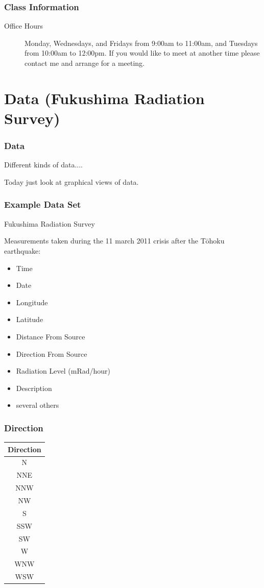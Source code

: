 \begin{frame}
  \frametitle{Class Information}

\begin{description}
  \item[Office Hours] Monday, Wednesdays, and Fridays from 9:00am to
    11:00am, and Tuesdays from 10:00am to 12:00pm.  If you would like
    to meet at another time please contact me and arrange for a
    meeting.

\end{description}


\end{frame}

\section{Data (Fukushima Radiation Survey)}

\begin{frame}
  \frametitle{Data}

  Different kinds of data....

  Today just look at graphical views of data.

\end{frame}

\begin{frame}
  \frametitle{Example Data Set}

  Fukushima Radiation Survey

  Measurements taken during the 11 march 2011 crisis after the
  T\={o}hoku earthquake:
  \begin{itemize}
  \item Time
  \item Date
  \item Longitude
  \item Latitude
  \item Distance From Source
  \item Direction From Source
  \item Radiation Level (mRad/hour)
  \item Description
  \item several others
  \end{itemize}

\end{frame}



\begin{frame}
  \frametitle{Direction}

  \begin{tabular}{c}
    Direction \\ \hline 
    N   \\
    NNE  \\
    NNW  \\
    NW  \\
    S  \\
    SSW \\
    SW  \\
    W  \\
    WNW  \\
    WSW 
  \end{tabular}

\end{frame}

